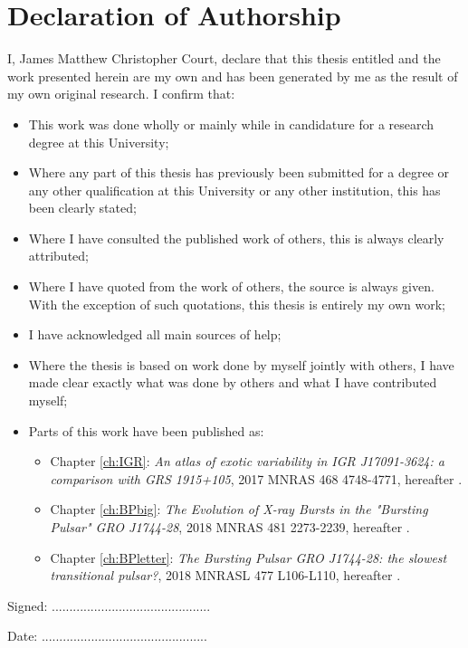 \chapter*{Declaration of Authorship}




I, James Matthew Christopher Court, declare that this thesis entitled \textit{\thesistitle} and the work presented herein are my own and has been generated by me as the result of my own original research. I confirm that:

\begin{itemize}
	\item{This work was done wholly or mainly while in candidature for a research degree at this University;}
	\item{Where any part of this thesis has previously been submitted for a degree or any other qualification at this University or any other institution, this has been clearly stated;}
	\item{Where I have consulted the published work of others, this is always clearly attributed;}
	\item{Where I have quoted from the work of others, the source is always given. With the exception of such quotations, this thesis is entirely my own work;}
	\item{I have acknowledged all main sources of help;}
	\item{Where the thesis is based on work done by myself jointly with others, I have made clear exactly what was done by others and what I have contributed myself;}
	\item{Parts of this work have been published as:}
\begin{itemize}
		\item{Chapter \ref{ch:IGR}: \textit{	
	An atlas of exotic variability in IGR J17091-3624: a comparison with GRS 1915+105}, 2017 MNRAS 468 4748-4771}, hereafter \citet{IGR}.
		\item{Chapter \ref{ch:BPbig}: \textit{The Evolution of X-ray Bursts in the "Bursting Pulsar" GRO J1744-28}, 2018 MNRAS 481 2273-2239}, hereafter \citet{BPpaper}.
		\item{Chapter \ref{ch:BPletter}: \textit{The Bursting Pulsar GRO J1744-28: the slowest transitional pulsar?}, 2018 MNRASL 477 L106-L110}, hereafter \citet{BPletter}.
\end{itemize}
\end{itemize}


Signed: .............................................

Date: ...............................................